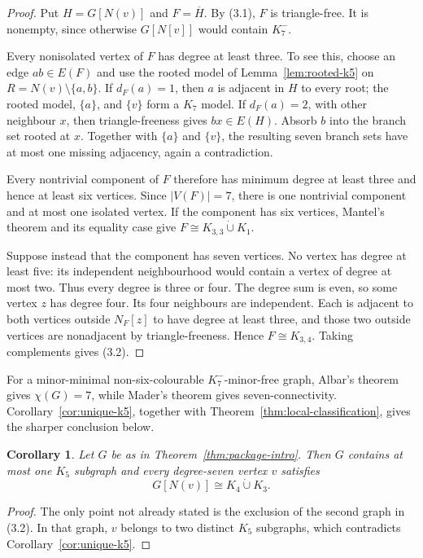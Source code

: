 \documentclass[11pt]{amsart}
\newtheorem{corollary}[theorem]{Corollary}
\newcommand{\N}{N}
\begin{document}
\begin{proof}
Put $H=G[\N(v)]$ and $F=\overline H$.  By (3.1), $F$ is triangle-free.
It is nonempty, since otherwise $G[\N[v]]$ would contain $K_7^{-}$.

Every nonisolated vertex of $F$ has degree at least three.  To see this,
choose an edge $ab\in E(F)$ and use the rooted model of
Lemma~\ref{lem:rooted-k5} on $R=\N(v)\setminus\{a,b\}$.  If $d_F(a)=1$,
then $a$ is adjacent in $H$ to every root; the rooted model, $\{a\}$, and
$\{v\}$ form a $K_7$ model.  If $d_F(a)=2$, with other neighbour $x$,
then triangle-freeness gives $bx\in E(H)$.  Absorb $b$ into the branch set
rooted at $x$.  Together with $\{a\}$ and $\{v\}$, the resulting seven
branch sets have at most one missing adjacency, again a contradiction.

Every nontrivial component of $F$ therefore has minimum degree at least
three and hence at least six vertices.  Since $|V(F)|=7$, there is one
nontrivial component and at most one isolated vertex.  If the component
has six vertices, Mantel's theorem and its equality case give
$F\cong K_{3,3}\mathbin{\dot\cup}K_1$.

Suppose instead that the component has seven vertices.  No vertex has
degree at least five: its independent neighbourhood would contain a
vertex of degree at most two.  Thus every degree is three or four.  The
degree sum is even, so some vertex $z$ has degree four.  Its four
neighbours are independent.  Each is adjacent to both vertices outside
$\N_F[z]$ to have degree at least three, and those two outside
vertices are nonadjacent by triangle-freeness.  Hence $F\cong K_{3,4}$.
Taking complements gives (3.2).
\end{proof}

For a minor-minimal non-six-colourable $K_7^{-}$-minor-free graph, Albar's
theorem gives $\chi(G)=7$, while Mader's theorem gives seven-connectivity.
Corollary~\ref{cor:unique-k5}, together with
Theorem~\ref{thm:local-classification}, gives the sharper conclusion below.

\begin{corollary}\label{cor:critical-local}
Let $G$ be as in Theorem~\ref{thm:package-intro}.  Then $G$ contains at
most one $K_5$ subgraph and every degree-seven vertex $v$ satisfies
\[
        G[\N(v)]\cong K_4\mathbin{\dot\cup}K_3.
\]
\end{corollary}

\begin{proof}
The only point not already stated is the exclusion of the second graph in
(3.2).  In that graph, $v$ belongs to two distinct $K_5$ subgraphs, which
contradicts Corollary~\ref{cor:unique-k5}.
\end{proof}
\end{document}
